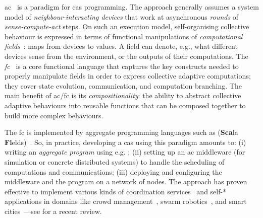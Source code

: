 \acl{ac}~\cite{DBLP:journals/computer/BealPV15,DBLP:journals/jlap/ViroliBDACP19} is a paradigm for \ac{cas} programming.
%
The approach generally assumes
 a system model of \emph{neighbour-interacting devices}
 that work at asynchronous \emph{rounds} of \emph{sense-compute-act} steps.
%
On such an execution model, %
 self-organising collective behaviour is expressed in terms of
 functional manipulations of \textit{computational fields}~\cite{DBLP:journals/jlap/ViroliBDACP19}: maps from devices to values.
%
%
A field can denote, e.g., what different devices sense from the environment,
 or the outputs of their computations.
%
The \emph{\acf{fc}}~\cite{DBLP:journals/jlap/ViroliBDACP19}  
 is a core functional language
 that captures the key constructs 
 needed to properly manipulate fields
 in order to express collective adaptive computations;
 they cover state evolution, communication, and computation branching.
%
The main benefit of \ac{ac}/\ac{fc} is its \emph{compositionality}: the ability to abstract collective adaptive behaviours into reusable functions that can be composed together to build more complex behaviours.
%

The \ac{fc} is implemented by aggregate programming languages such 
 as \emph{\scafi{}} (\textbf{Sca}la \textbf{Fi}elds)~\cite{DBLP:conf/isola/CasadeiVAD20}.
%
So, in practice, developing a \ac{cas} using this paradigm amounts to: 
 (i) writing an \emph{aggregate program} using e.g. \scafi{};
 (ii) setting up an \ac{ac} middleware (for simulation or concrete distributed systems) to handle the scheduling of computations and communications;
 (iii) deploying and configuring the middleware and the program on a network of nodes.
%
The approach has proven effective to implement various kinds of coordination services~\cite{DBLP:conf/coordination/CasadeiVRA21} and self-* applications
 in domains
 like crowd management~\cite{DBLP:journals/computer/BealPV15}, 
 swarm robotics~\cite{DBLP:journals/jsan/CasadeiAV21},  
 and smart cities~\cite{DBLP:journals/fi/CasadeiPPVW20}---see \cite{DBLP:journals/jlap/ViroliBDACP19} for a recent review. 


